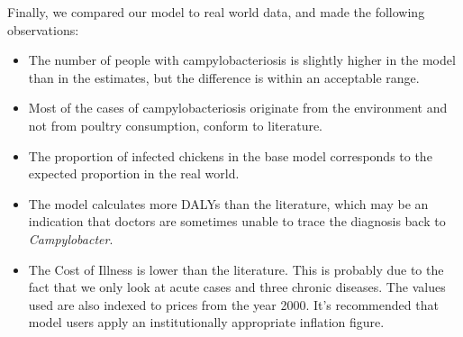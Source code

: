 Finally, we compared our model to real world data, and made the following observations:
\begin{itemize}
    \item The number of people with campylobacteriosis is slightly higher in the model than in the estimates, but the difference is within an acceptable range.
    \item Most of the cases of campylobacteriosis originate from the environment and not from poultry consumption, conform to literature.
    \item The proportion of infected chickens in the base model corresponds to the expected proportion in the real world.
    \item The model calculates more DALYs than the literature, which may be an indication that doctors are sometimes unable to trace the diagnosis back to \textit{Campylobacter}.
    \item The Cost of Illness is lower than the literature. This is probably due to the fact that we only look at acute cases and three chronic diseases. The values used are also indexed to prices from the year 2000. It's recommended that model users apply an institutionally appropriate inflation figure.
\end{itemize}

